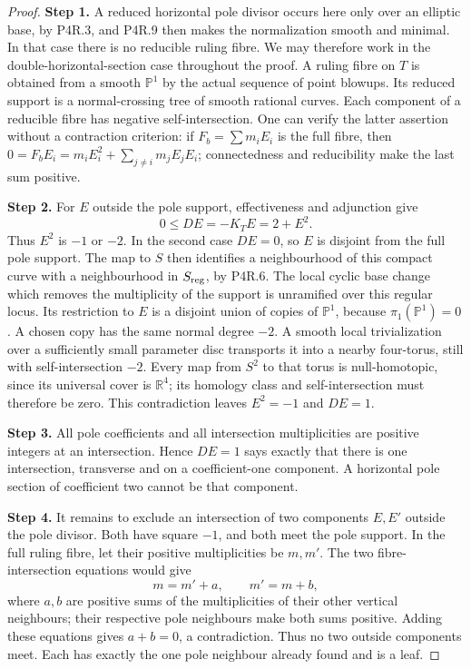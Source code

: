\begin{proof}
\noindent\textbf{Step 1.} A reduced horizontal pole divisor occurs here only over an
elliptic base, by P4R.3, and P4R.9 then makes the normalization
smooth and minimal. In that case there is no reducible ruling
fibre. We may therefore work in the double-horizontal-section
case throughout the proof.
A ruling fibre on $T$ is obtained from a smooth $\mathbb P^1$
by the actual sequence of point blowups. Its reduced support is
a normal-crossing tree of smooth rational curves. Each component
of a reducible fibre has negative self-intersection. One can
verify the latter assertion without a contraction criterion:
if $F_b=\sum m_iE_i$ is the full fibre, then
$0=F_bE_i=m_iE_i^2+\sum_{j\ne i}m_jE_jE_i$;
connectedness and reducibility make the last sum positive.

\noindent\textbf{Step 2.} For $E$ outside the pole support, effectiveness and adjunction give
\[
 0\le DE=-K_TE=2+E^2.
\]
Thus $E^2$ is $-1$ or $-2$. In the second case $DE=0$,
so $E$ is disjoint from the full pole support. The map to $S$
then identifies a neighbourhood of this compact curve with a
neighbourhood in $S_{\rm reg}$, by P4R.6. The local cyclic
base change which removes the multiplicity of the support is
unramified over this regular locus. Its restriction to $E$ is
a disjoint union of copies of $\mathbb P^1$, because
$\pi_1(\mathbb P^1)=0$. A chosen copy has the same normal
degree $-2$. A smooth local trivialization over a sufficiently
small parameter disc transports it into a nearby four-torus,
still with self-intersection $-2$. Every map from $S^2$ to that
torus is null-homotopic, since its universal cover is
$\mathbb R^4$; its homology class and self-intersection must
therefore be zero. This contradiction leaves $E^2=-1$ and
$DE=1$.

\noindent\textbf{Step 3.} All pole coefficients and all intersection multiplicities are
positive integers at an intersection. Hence $DE=1$ says exactly
that there is one intersection, transverse and on a coefficient-one
component. A horizontal pole section of coefficient two cannot
be that component.

\noindent\textbf{Step 4.} It remains to exclude an intersection of two components $E,E'$
outside the pole divisor. Both have square $-1$, and both meet
the pole support. In the full ruling fibre, let their positive
multiplicities be $m,m'$. The two fibre-intersection equations
would give
\[
 m=m'+a,\qquad m'=m+b,
\]
where $a,b$ are positive sums of the multiplicities of their
other vertical neighbours; their respective pole neighbours make both
sums positive. Adding these equations gives $a+b=0$, a
contradiction. Thus no two outside components meet. Each has
exactly the one pole neighbour already found and is a leaf.
\end{proof}

